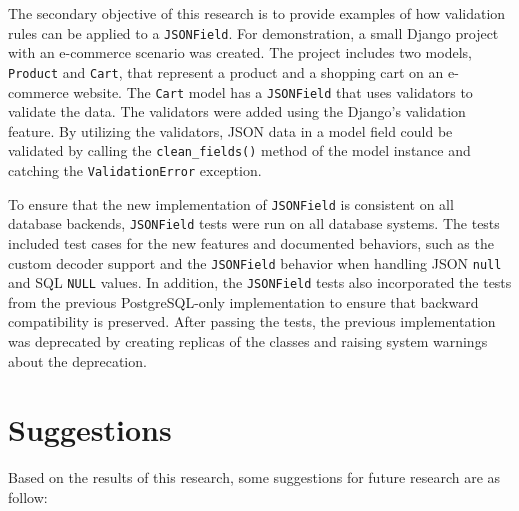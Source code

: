The secondary objective of this research is to provide examples of how
validation rules can be applied to a \verb|JSONField|. For demonstration, a
small Django project with an e-commerce scenario was created. The project
includes two models, \verb|Product| and \verb|Cart|, that represent a product
and a shopping cart on an e-commerce website. The \verb|Cart| model has a
\verb|JSONField| that uses validators to validate the data. The validators were
added using the Django's validation feature. By utilizing the validators, JSON
data in a model field could be validated by calling the \verb|clean_fields()|
method of the model instance and catching the \verb|ValidationError| exception.

To ensure that the new implementation of \verb|JSONField| is consistent on all
database backends, \verb|JSONField| tests were run on all database systems. The
tests included test cases for the new features and documented behaviors, such
as the custom decoder support and the \verb|JSONField| behavior when handling
JSON \verb|null| and SQL \verb|NULL| values. In addition, the \verb|JSONField|
tests also incorporated the tests from the previous PostgreSQL-only
implementation to ensure that backward compatibility is preserved. After
passing the tests, the previous implementation was deprecated by creating
replicas of the classes and raising system warnings about the deprecation.

\section{Suggestions}
Based on the results of this research, some suggestions for future research are
as follow:


